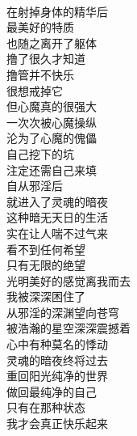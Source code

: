 \begin{poem}[灵魂的暗夜]
    \begin{multicols}{3}
        \centering~\\
        在射掉身体的精华后 \\ 最美好的特质 \\ 也随之离开了躯体 \\ 撸了很久才知道 \\ 撸管并不快乐 \\ 很想戒掉它 \\ 但心魔真的很强大 \\ 一次次被心魔操纵 \\ 沦为了心魔的傀儡 \\ 自己挖下的坑 \\ 注定还需自己来填 \\ 自从邪淫后 \\ 就进入了灵魂的暗夜 \\ 这种暗无天日的生活 \\ 实在让人喘不过气来 \\ 看不到任何希望 \\ 只有无限的绝望 \\ 光明美好的感觉离我而去 \\ 我被深深困住了 \\ 从邪淫的深渊望向苍穹 \\ 被浩瀚的星空深深震撼着 \\ 心中有种莫名的悸动 \\ 灵魂的暗夜终将过去 \\ 重回阳光纯净的世界 \\ 做回最纯净的自己 \\ 只有在那种状态 \\ 我才会真正快乐起来
    \end{multicols}
\end{poem}


